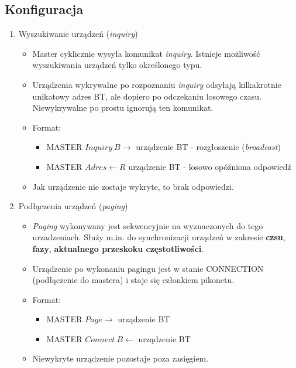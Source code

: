 \subsection{Konfiguracja}
\begin{enumerate}
	\item Wyszukiwanie urządzeń (\emph{inquiry})
	\begin{itemize}
		\item Master cyklicznie wysyła komunikat \emph{inquiry}. Istnieje możliwość wyszukiwania urządzeń tylko określonego typu.
		\item Urządzenia wykrywalne po rozpoznaniu \emph{inquiry} odsyłają kilkakrotnie unikatowy adres BT, ale dopiero po odczekaniu losowego czasu. Niewykrywalne po prostu ignorują ten komunikat.
		\item Format:
		\begin{itemize}
			\item MASTER $ Inquiry\:B \rightarrow $ urządzenie BT - rozgłoszenie (\emph{broadcast})
			\item MASTER $ Adres \leftarrow R $ urządzenie BT - losowo opóźniona odpowiedź
		\end{itemize}
		\item Jak urządzenie nie zostaje wykryte, to brak odpowiedzi.
	\end{itemize}
	\item Podłączenia urządzeń (\emph{paging})
	\begin{itemize}
		\item \emph{Paging} wykonywany jest sekwencyjnie na wyznaczonych do tego urzadzeniach. Służy m.in. do synchronizacji urządzeń w zakresie \textbf{czsu}, \textbf{fazy}, \textbf{aktualnego przeskoku częstotliwości}.
		\item Urządzenie po wykonaniu pagingu jest w stanie CONNECTION (podłączenie do mastera) i staje się członkiem pikonetu.
		\item Format:
		\begin{itemize}
			\item MASTER $ Page \rightarrow $ urządzenie BT
			\item MASTER $ Connect\:B \leftarrow $ urządzenie BT
		\end{itemize}
		\item Niewykryte urządzenie pozostaje poza zasięgiem.
	\end{itemize}
\end{enumerate}
